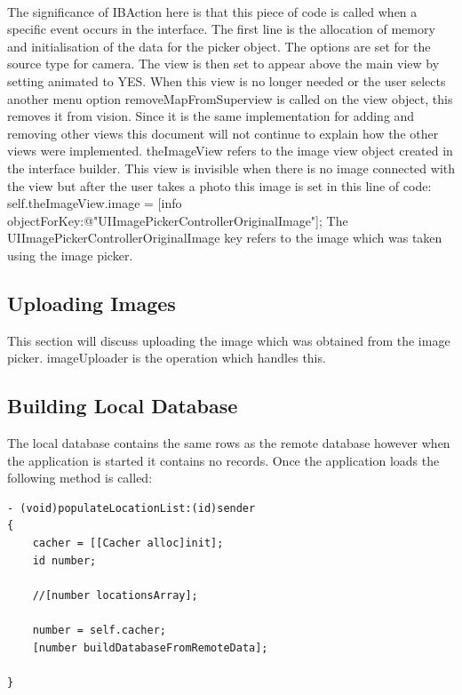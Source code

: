 \documentclass[12pt]{article}
\begin{document}
\paragraph{}
The significance of IBAction here is that this piece of code is called when a specific event occurs in the interface. The first line is the allocation of memory and initialisation of the data for the picker object.
The options are set for the source type for camera. The view is then set to appear above the main view by setting animated to YES.
When this view is no longer needed or the user selects another menu option removeMapFromSuperview is called on the view object, this removes it from vision. Since it is the same implementation for adding and removing other views this document will not continue to explain how the other views were implemented.
theImageView refers to the image view object created in the interface builder. This view is invisible when there is no image connected with the view but after the user takes a photo this image is set in this line of code:
self.theImageView.image = [info objectForKey:@"UIImagePickerControllerOriginalImage"];
The UIImagePickerControllerOriginalImage key refers to the image which was taken using the image picker.

\subsection{Uploading Images}

This section will discuss uploading the image which was obtained from the image picker. imageUploader is the operation which handles this. 

\subsection{Building Local Database}

The local database contains the same rows as the remote database however when the application is started it contains no records. Once the application loads the following method is called:

\begin{verbatim}
- (void)populateLocationList:(id)sender
{
	cacher = [[Cacher alloc]init];
	id number;
	
	//[number locationsArray];	
	
	number = self.cacher;
    [number buildDatabaseFromRemoteData];
	
}
\end{verbatim}
\end{document}
